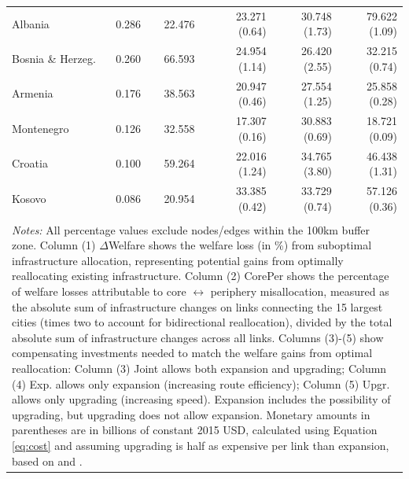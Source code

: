 \documentclass[a4paper]{article}
\begin{document}
\begin{table}[h!]
\begin{tabular}{lccrrr}
  Albania & 0.286 & 22.476 & 23.271 (\hphantom{1}0.64) & 30.748 (\hphantom{1}1.73) & 79.622 (\hphantom{1}1.09) \\ 
  Bosnia \& Herzeg. & 0.260 & 66.593 & 24.954 (\hphantom{1}1.14) & 26.420 (\hphantom{1}2.55) & 32.215 (\hphantom{1}0.74) \\ 
  Armenia & 0.176 & 38.563 & 20.947 (\hphantom{1}0.46) & 27.554 (\hphantom{1}1.25) & 25.858 (\hphantom{1}0.28) \\ 
  Montenegro & 0.126 & 32.558 & 17.307 (\hphantom{1}0.16) & 30.883 (\hphantom{1}0.69) & 18.721 (\hphantom{1}0.09) \\ 
  Croatia & 0.100 & 59.264 & 22.016 (\hphantom{1}1.24) & 34.765 (\hphantom{1}3.80) & 46.438 (\hphantom{1}1.31) \\ 
  Kosovo & 0.086 & 20.954 & 33.385 (\hphantom{1}0.42) & 33.729 (\hphantom{1}0.74) & 57.126 (\hphantom{1}0.36) \\  
  \bottomrule \\ [-0.9em]
\multicolumn{6}{l}{\parbox{0.98\textwidth}{\scriptsize
\textit{Notes:} All percentage values exclude nodes/edges within the 100km buffer zone. Column (1) $\Delta$Welfare shows the welfare loss (in \%) from suboptimal infrastructure allocation, representing potential gains from optimally reallocating existing infrastructure. Column (2) CorePer shows the percentage of welfare losses attributable to core $\leftrightarrow$ periphery misallocation, measured as the absolute sum of infrastructure changes on links connecting the 15 largest cities (times two to account for bidirectional reallocation), divided by the total absolute sum of infrastructure changes across all links. Columns (3)-(5) show compensating investments needed to match the welfare gains from optimal reallocation: Column (3) Joint allows both expansion and upgrading; Column (4) Exp. allows only expansion (increasing route efficiency); Column (5) Upgr. allows only upgrading (increasing speed). Expansion includes the possibility of upgrading, but upgrading does not allow expansion. Monetary amounts in parentheses are in billions of constant 2015 USD, calculated using Equation \ref{eq:cost} and assuming upgrading is half as expensive per link than expansion, based on \citet{krantz2024optimal} and \citet{rocks2018}.}}
\end{tabular}
\end{table}

\end{document}
